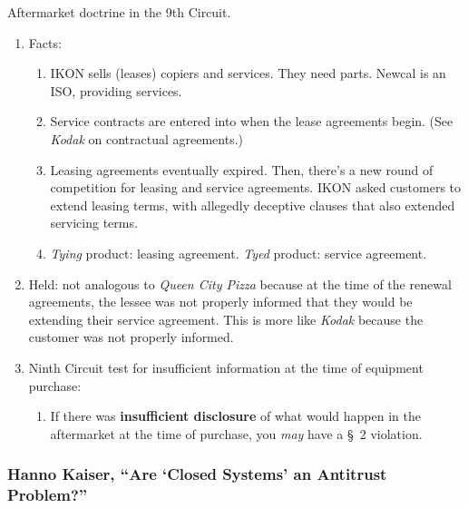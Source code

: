 Aftermarket doctrine in the 9th Circuit.

\begin{enumerate}
    \item Facts:
    \begin{enumerate}
        \item IKON sells (leases) copiers and services. They need parts. Newcal is an 
        ISO, providing services.
        \item Service contracts are entered into when the lease agreements 
        begin. (See \emph{Kodak} on contractual agreements.)
        \item Leasing agreements eventually expired. Then, there's a new round 
        of competition for leasing and service agreements. IKON asked 
        customers to extend leasing terms, with allegedly deceptive clauses 
        that also extended servicing terms.
        \item \emph{Tying} product: leasing agreement. \emph{Tyed} product: 
        service agreement.
    \end{enumerate}
    \item Held: not analogous to \emph{Queen City Pizza} because at the time 
    of the renewal agreements, the lessee was not properly informed that they 
    would be extending their service agreement. This is more like \emph{Kodak} 
    because the customer was not properly informed.
    \item Ninth Circuit test for insufficient information at the time of 
    equipment purchase:
    \begin{enumerate}
        \item If there was \textbf{insufficient disclosure} of what would 
        happen in the aftermarket at the time of purchase, you \emph{may} have 
        a \S\ 2 violation.
    \end{enumerate}
\end{enumerate}

\subsubsection{Hanno Kaiser, ``Are `Closed Systems' an Antitrust Problem?''}

